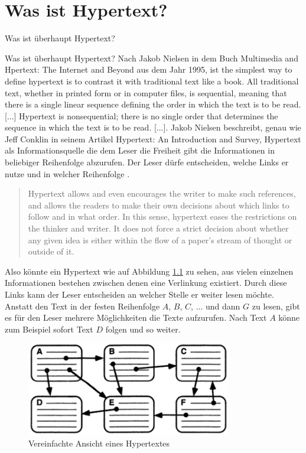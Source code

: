 \chapter{Was ist Hypertext?}
\label{ch:Was ist Hypertext?}

\begin{section}{Was ist überhaupt Hypertext?}
\label{sec:big_brother}

Was ist überhaupt Hypertext? Nach Jakob Nielsen in dem Buch Multimedia and Hpertext: The Internet and Beyond aus dem Jahr 1995, ist \glqq the simplest way to define hypertext is to contrast it with traditional text like a book. All traditional text, whether in printed form or in computer files, is sequential, meaning that there is a single linear sequence defining the order in which the text is to be read. [...] Hypertext is nonsequential; there is no single order that determines the sequence in which the text is to be read. [...]\grqq{ }\cite[S.1]{Nielsen1995}. Jakob Nielsen beschreibt, genau wie Jeff Conklin in seinem Artikel Hypertext: An Introduction and Survey, Hypertext als Informationsquelle die dem Leser die Freiheit gibt die Informationen in beliebiger Reihenfolge abzurufen. Der Leser dürfe entscheiden, welche Links er nutze und in welcher Reihenfolge \cite[S.33]{Conklin1987} \cite[S.1]{Nielsen1995}.

\begin{quote}
\glqq Hypertext allows and even encourages the writer to make such references, and allows the readers to make their own decisions about which links to follow and in what order. In this sense, hypertext eases the restrictions on the thinker and writer. It does not force a strict decision about whether any given idea is either within the flow of a paper's stream of thought or outside of it.\grqq{ }\cite[S.33]{Conklin1987}
\end{quote}

Also könnte ein Hypertext wie auf Abbildung \ref{fig:nielsenLink} zu sehen, aus vielen einzelnen Informationen bestehen zwischen denen eine Verlinkung existiert. Durch diese Links kann der Leser entscheiden an welcher Stelle er weiter lesen möchte. Anstatt den Text in der festen Reihenfolge $A$, $B$, $C$, $...$ und dann $G$ zu lesen, gibt es für den Leser mehrere Möglichkeiten die Texte aufzurufen. Nach Text $A$ könne zum Beispiel sofort Text $D$ folgen und so weiter\cite[S.1]{Nielsen1995}.

\begin{figure}[H]
	\centering
	\includegraphics[width=0.8\textwidth]{image/nielsenLink}
	\caption{Vereinfachte Ansicht eines Hypertextes \cite[S.1]{Nielsen1995}}
	\label{fig:nielsenLink}
\end{figure}



\end{section}
